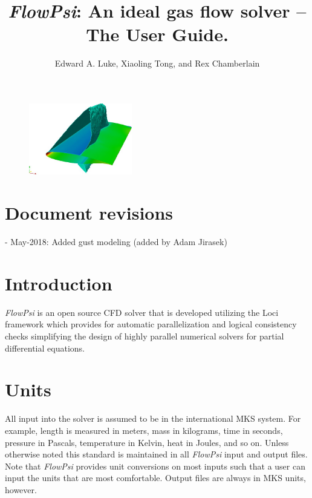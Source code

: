 \documentclass{article}
\begin{document}
\title{{\em FlowPsi}: An ideal gas flow solver -- The User Guide.}

\author{ Edward A. Luke, Xiaoling Tong, and Rex Chamberlain}

\maketitle


\begin{figure}[htb]
\begin{center}
\includegraphics[width=0.4\textwidth]{FIG.jpg}
\end{center}
\end{figure}

\newpage
\tableofcontents
\clearpage


\newpage
\section*{Document revisions}
- May-2018: Added gust modeling  (added by Adam Jirasek)\\

\newpage
\section{Introduction}

{\em FlowPsi } is an open source CFD solver that is developed
utilizing the Loci framework\cite{Luke.2005,Zhang.2009} which provides
for automatic parallelization and logical consistency checks
simplifying the design of highly parallel numerical solvers for
partial differential equations.

\section{Units}

All input into the solver is assumed to be in the international MKS
system.  For example, length is measured in meters, mass in kilograms,
time in seconds, pressure in Pascals, temperature in Kelvin, heat in
Joules, and so on.  Unless otherwise noted this standard is maintained
in all {\em FlowPsi} input and output files.  Note that {\em FlowPsi}
provides unit conversions on most inputs such that a user can input
the units that are most comfortable.  Output files are always in MKS
units, however.
\end{document}
